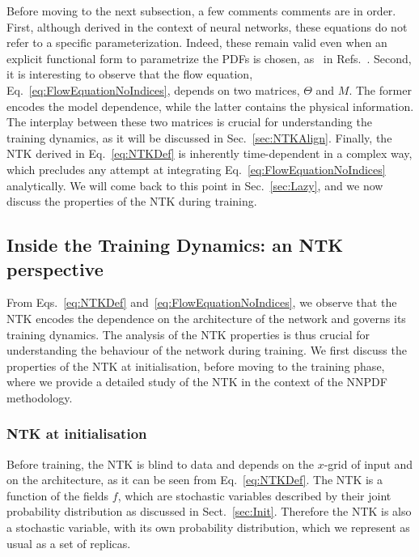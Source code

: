 Before moving to the next subsection, a few comments comments are in order.
First, although derived in the context of neural networks, these equations do
not refer to a specific parameterization. Indeed, these remain valid even when
an explicit functional form to parametrize the PDFs is chosen, as \eg~in
Refs.~\cite{Bailey:2020ooq,Hou:2019efy,Costantini:2025wxp}. Second, it is
interesting to observe that the flow equation,
Eq.~\eqref{eq:FlowEquationNoIndices}, depends on two matrices, $\Theta$ and $M$.
The former encodes the model dependence, while the latter contains the physical
information. The interplay between these two matrices is crucial for
understanding the training dynamics, as it will be discussed in
Sec.~\ref{sec:NTKAlign}. Finally, the NTK derived in Eq.~\ref{eq:NTKDef} is
inherently time-dependent in a complex way, which precludes any attempt at
integrating Eq.~\ref{eq:FlowEquationNoIndices} analytically. We will come back
to this point in Sec.~\ref{sec:Lazy}, and we now discuss the properties of the
NTK during training.

\FloatBarrier

\subsection{Inside the Training Dynamics: an NTK perspective}

From Eqs.~\eqref{eq:NTKDef} and~\eqref{eq:FlowEquationNoIndices}, we observe
that the NTK encodes the dependence on the architecture of the network and
governs its training dynamics. The analysis of the NTK properties is thus
crucial for understanding the behaviour of the network during training. We first
discuss the properties of the NTK at initialisation, before moving to the
training phase, where we provide a detailed study of the NTK in the context of
the NNPDF methodology.

\subsubsection{NTK at initialisation}
\label{sec:NTKAtInit}

Before training, the NTK is blind to data and depends on the $x$-grid of input
and on the architecture, as it can be seen from Eq.~\eqref{eq:NTKDef}. The NTK
is a function of the fields $f$, which are stochastic variables described by
their joint probability distribution as discussed in Sect.~\ref{sec:Init}.
Therefore the NTK is also a stochastic variable, with its own probability
distribution, which we represent as usual as a set of replicas. 

